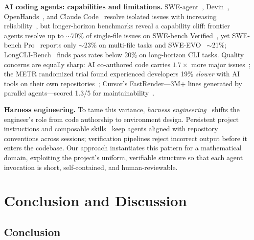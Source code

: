 \documentclass[conference]{IEEEtran}
\begin{document}
\textbf{AI coding agents: capabilities and limitations.}
SWE-agent~\cite{Yang2024SWEagent}, Devin~\cite{Wu2024Devin}, OpenHands~\cite{Wang2024OpenHands}, and Claude Code~\cite{Anthropic2025ClaudeCode} resolve isolated issues with increasing reliability~\cite{Xia2025LiveSWEagent}, but longer-horizon benchmarks reveal a capability cliff: frontier agents resolve up to $\sim$70\% of single-file issues on SWE-bench Verified~\cite{jimenez2024swebench}, yet SWE-bench Pro~\cite{Deng2025SWEBenchPro} reports only $\sim$23\% on multi-file tasks and SWE-EVO~\cite{Thai2025SWEEVO} $\sim$21\%; LongCLI-Bench~\cite{LongCLIBench2026} finds pass rates below 20\% on long-horizon CLI tasks.
Quality concerns are equally sharp: AI co-authored code carries $1.7{\times}$ more major issues~\cite{CodeRabbit2025AICodeQuality}; the METR randomized trial found experienced developers 19\% \emph{slower} with AI tools on their own repositories~\cite{Becker2025METRProductivityRCT}; Cursor's FastRender---3M+ lines generated by parallel agents---scored 1.3/5 for maintainability~\cite{CursorFastRender2026,SIGFastRender2026}.

\textbf{Harness engineering.}
To tame this variance, \emph{harness engineering}~\cite{OpenAI2026HarnessEngineering,Fowler2026HarnessEngineering} shifts the engineer's role from code authorship to environment design.
Persistent project instructions and composable skills~\cite{Claude2026AgentSkills, Obra2025Superpowers} keep agents aligned with repository conventions across sessions; verification pipelines reject incorrect output before it enters the codebase.
Our approach instantiates this pattern for a mathematical domain, exploiting the project's uniform, verifiable structure so that each agent invocation is short, self-contained, and human-reviewable.

\section{Conclusion and Discussion}\label{sec:conclusion}

\subsection{Conclusion}
\end{document}
